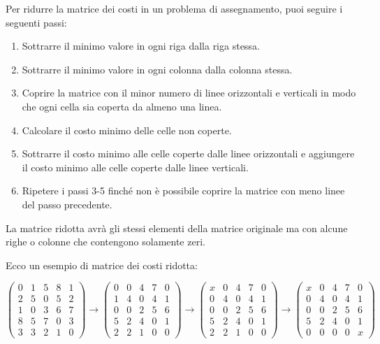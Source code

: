 Per ridurre la matrice dei costi in un problema di assegnamento, puoi seguire i seguenti passi:
\begin{enumerate}
  
\item Sottrarre il minimo valore in ogni riga dalla riga stessa.
\item Sottrarre il minimo valore in ogni colonna dalla colonna stessa.
\item Coprire la matrice con il minor numero di linee orizzontali e verticali in modo che ogni cella sia coperta da almeno una linea.
\item Calcolare il costo minimo delle celle non coperte.
\item Sottrarre il costo minimo alle celle coperte dalle linee orizzontali e aggiungere il costo minimo alle celle coperte dalle linee verticali.
\item Ripetere i passi 3-5 finché non è possibile coprire la matrice con meno linee del passo precedente.

\end{enumerate}
La matrice ridotta avrà gli stessi elementi della matrice originale ma con alcune righe o colonne che contengono solamente zeri. 

Ecco un esempio di matrice dei costi ridotta:

$$
\begin{pmatrix}
0 & 1 & 5 & 8 & 1 \\
2 & 5 & 0 & 5 & 2 \\
1 & 0 & 3 & 6 & 7 \\
8 & 5 & 7 & 0 & 3 \\
3 & 3 & 2 & 1 & 0
\end{pmatrix}
\rightarrow
\begin{pmatrix}
0 & 0 & 4 & 7 & 0 \\
1 & 4 & 0 & 4 & 1 \\
0 & 0 & 2 & 5 & 6 \\
5 & 2 & 4 & 0 & 1 \\
2 & 2 & 1 & 0 & 0
\end{pmatrix}
\rightarrow
\begin{pmatrix}
x & 0 & 4 & 7 & 0 \\
0 & 4 & 0 & 4 & 1 \\
0 & 0 & 2 & 5 & 6 \\
5 & 2 & 4 & 0 & 1 \\
2 & 2 & 1 & 0 & 0
\end{pmatrix}
\rightarrow
\begin{pmatrix}
x & 0 & 4 & 7 & 0 \\
0 & 4 & 0 & 4 & 1 \\
0 & 0 & 2 & 5 & 6 \\
5 & 2 & 4 & 0 & 1 \\
0 & 0 & 0 & 0 & x
\end{pmatrix}
$$

